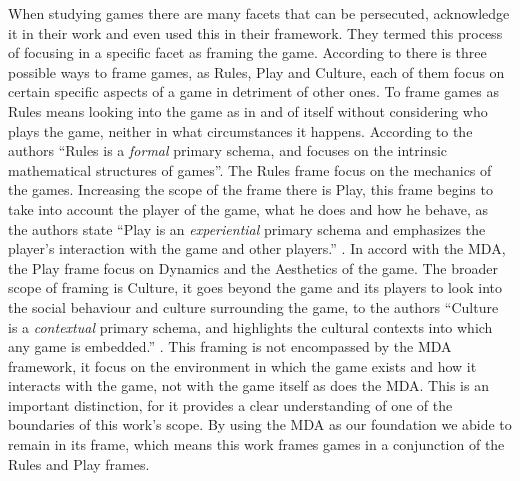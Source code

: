 When studying games there are many facets that can be persecuted, \cite{salen2004rules} acknowledge it in their work and even used this in their framework. They termed this process of focusing in a specific facet as framing the game. According to \cite{salen2004rules} there is three possible ways to frame games, as Rules, Play and Culture, each of them focus on certain specific aspects of a game in detriment of other ones. To frame games as Rules means looking into the game as in and of itself without considering who plays the game, neither in what circumstances it happens. According to the authors ``Rules is a \textit{formal} primary schema, and focuses on the intrinsic mathematical structures of games''\citep{salen2004rules}. The Rules frame focus on the mechanics of the games. Increasing the scope of the frame there is Play, this frame begins to take into account the player of the game, what he does and how he behave, as the authors state ``Play is an \textit{experiential} primary schema and emphasizes the player's interaction with the game and other players.'' \cite{salen2004rules}. In accord with the MDA, the Play frame focus on Dynamics and the Aesthetics of the game. The broader scope of framing is Culture, it goes beyond the game and its players to look into the social behaviour and culture surrounding the game, to the authors ``Culture is a \textit{contextual} primary schema, and highlights the cultural contexts into which any game is embedded.'' \cite{salen2004rules}. This framing is not encompassed by the MDA framework, it focus on the environment in which the game exists and how it interacts with the game, not with the game itself as does the MDA. This is an important distinction, for it provides a clear understanding of one of the boundaries of this work's scope. By using the MDA as our foundation we abide to remain in its frame, which means this work frames games in a conjunction of the Rules and Play frames.

